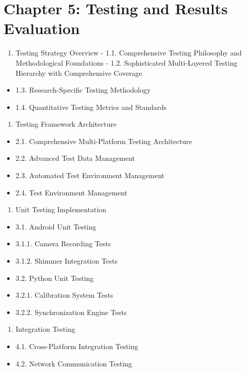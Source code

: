 \documentclass[11pt,a4paper]{report}
\begin{document}
\section{Chapter 5: Testing and Results Evaluation}

\begin{enumerate}
\item Testing Strategy Overview
    -
    1.1. Comprehensive Testing Philosophy and Methodological Foundations
    -
    1.2. Sophisticated Multi-Layered Testing Hierarchy with Comprehensive Coverage
\end{enumerate}
\begin{itemize}
\item 1.3. Research-Specific Testing Methodology
\item 1.4. Quantitative Testing Metrics and Standards
\end{itemize}
\begin{enumerate}
\item Testing Framework Architecture
\end{enumerate}
\begin{itemize}
\item 2.1. Comprehensive Multi-Platform Testing Architecture
\item 2.2. Advanced Test Data Management
\item 2.3. Automated Test Environment Management
\item 2.4. Test Environment Management
\end{itemize}
\begin{enumerate}
\item Unit Testing Implementation
\end{enumerate}
\begin{itemize}
\item 3.1. Android Unit Testing
\item 3.1.1. Camera Recording Tests
\item 3.1.2. Shimmer Integration Tests
\item 3.2. Python Unit Testing
\item 3.2.1. Calibration System Tests
\item 3.2.2. Synchronization Engine Tests
\end{itemize}
\begin{enumerate}
\item Integration Testing
\end{enumerate}
\begin{itemize}
\item 4.1. Cross-Platform Integration Testing
\item 4.2. Network Communication Testing
\end{itemize}
\end{document}
